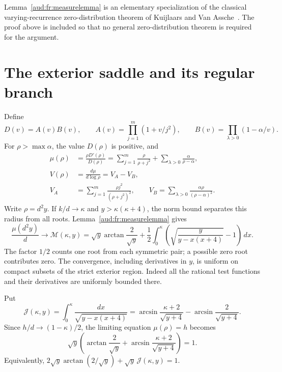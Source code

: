Lemma~\ref{aud:fr:measurelemma} is an elementary specialization of the classical varying-recurrence zero-distribution theorem of Kuijlaars and Van Assche~\cite[Theorem 1.4]{kuijlaars}. The proof above is included so that no general zero-distribution theorem is required for the argument.

\section{The exterior saddle and its regular branch}
Define
\begin{equation}\label{aud:fr:Laurent}
 D(v)=A(v)B(v),\qquad
 A(v)=\prod_{j=1}^m(1+v/j^2),\qquad
 B(v)=\prod_{\lambda>0}(1-\alpha/v).
\end{equation}
For $\rho>\max\alpha$, the value $D(\rho)$ is positive, and
\begin{align}
 \mu(\rho)&=\frac{\rho D'(\rho)}{D(\rho)}
 =\sum_{j=1}^m\frac{\rho}{\rho+j^2}
   +\sum_{\lambda>0}\frac{\alpha}{\rho-\alpha},
 \label{aud:fr:mean}\\
 V(\rho)&=\frac{d\mu}{d\log\rho}=V_A-V_B,
 \label{aud:fr:curvaturefinite}\\
 V_A&=\sum_{j=1}^m\frac{\rho j^2}{(\rho+j^2)^2},\qquad
 V_B=\sum_{\lambda>0}\frac{\alpha\rho}{(\rho-\alpha)^2}.
 \nonumber
\end{align}
Write $\rho=d^2y$. If $k/d\to\kappa$ and $y>\kappa(\kappa+4)$, the norm bound separates this radius from all roots. Lemma~\ref{aud:fr:measurelemma} gives
\begin{equation}\label{aud:fr:meanlimit}
 \frac{\mu(d^2y)}d\longrightarrow \mathcal M(\kappa,y)
 =\sqrt y\arctan\frac2{\sqrt y}
 +\frac12\int_0^\kappa
 \left(\sqrt{\frac y{y-x(x+4)}}-1\right)\,dx.
\end{equation}
The factor $1/2$ counts one root from each symmetric pair; a possible zero root contributes zero. The convergence, including derivatives in $y$, is uniform on compact subsets of the strict exterior region. Indeed all the rational test functions and their derivatives are uniformly bounded there.

Put
\begin{equation}\label{aud:fr:J}
 \mathcal J(\kappa,y)=\int_0^\kappa\frac{dx}{\sqrt{y-x(x+4)}}
 =\arcsin\frac{\kappa+2}{\sqrt{y+4}}
  -\arcsin\frac2{\sqrt{y+4}}.
\end{equation}
Since $h/d\to(1-\kappa)/2$, the limiting equation $\mu(\rho)=h$ becomes
\begin{equation}\label{aud:fr:saddleequation}
 \sqrt y\left(\arctan\frac2{\sqrt y}
       +\arcsin\frac{\kappa+2}{\sqrt{y+4}}\right)=1.
\end{equation}
Equivalently, $2\sqrt y\arctan(2/\sqrt y)+\sqrt y\,\mathcal J(\kappa,y)=1$.

